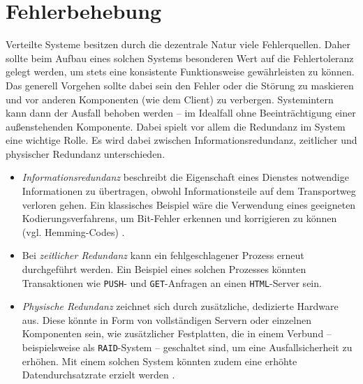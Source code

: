 \documentclass[12pt,a4paper,parskip=half]{scrreprt}
\begin{document}
	\section{Fehlerbehebung}
	Verteilte Systeme besitzen durch die dezentrale Natur viele Fehlerquellen. Daher sollte beim Aufbau eines solchen Systems besonderen Wert auf die Fehlertoleranz gelegt werden, um stets eine konsistente Funktionsweise gewährleisten zu können.\\
	Das generell Vorgehen sollte dabei sein den Fehler oder die Störung zu maskieren und vor anderen Komponenten (wie dem Client) zu verbergen. Systemintern kann dann der Ausfall behoben werden -- im Idealfall ohne Beeinträchtigung einer außenstehenden Komponente. Dabei spielt vor allem die Redundanz im System eine wichtige Rolle. Es wird dabei zwischen Informationsredundanz, zeitlicher und physischer Redundanz unterschieden.
	\begin{itemize}
		\item \textit{Informationsredundanz} beschreibt die Eigenschaft eines Dienstes notwendige Informationen zu übertragen, obwohl Informationsteile auf dem Transportweg verloren gehen. Ein klassisches Beispiel wäre die Verwendung eines geeigneten Kodierungsverfahrens, um Bit-Fehler erkennen und korrigieren zu können (vgl. Hemming-Codes) \cite{hamming}.
		\item Bei \textit{zeitlicher Redundanz} kann ein fehlgeschlagener Prozess erneut durchgeführt werden. Ein Beispiel eines solchen Prozesses könnten Transaktionen wie \texttt{PUSH}- und \texttt{GET}-Anfragen an einen \texttt{HTML}-Server sein.
		\item \textit{Physische Redundanz} zeichnet sich durch zusätzliche, dedizierte Hardware aus. Diese könnte in Form von vollständigen Servern oder einzelnen Komponenten sein, wie zusätzlicher Festplatten, die in einem Verbund -- beispielsweise als \texttt{RAID}-System -- geschaltet sind, um eine Ausfallsicherheit zu erhöhen. Mit einem solchen System könnten zudem eine erhöhte Datendurchsatzrate erzielt werden \cite{raid}.
	\end{itemize}
	
	\newpage
	
	\nocite{*}
	\thispagestyle{headings}
	
	
	 
	
\end{document}

